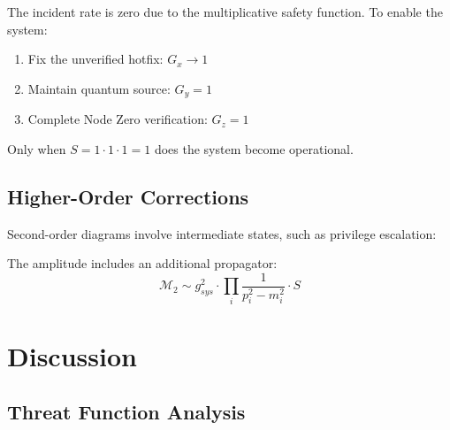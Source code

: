 \documentclass[11pt,a4paper]{article}
\begin{document}
The incident rate is zero due to the multiplicative safety function. To enable the system:
\begin{enumerate}
    \item Fix the unverified hotfix: $G_x \to 1$
    \item Maintain quantum source: $G_y = 1$
    \item Complete Node Zero verification: $G_z = 1$
\end{enumerate}

Only when $S = 1 \cdot 1 \cdot 1 = 1$ does the system become operational.

\subsection{Higher-Order Corrections}

Second-order diagrams involve intermediate states, such as privilege escalation:

\begin{center}
\end{center}

The amplitude includes an additional propagator:
\begin{equation}
\mathcal{M}_2 \sim g_{sys}^2 \cdot \prod_i \frac{1}{p_i^2 - m_i^2} \cdot S
\end{equation}

\section{Discussion}

\subsection{Threat Function Analysis}
\end{document}

